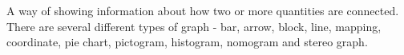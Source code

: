                                         A way of showing information about how two or more quantities 
are connected.
There are several different types of graph - bar, arrow, block, line, mapping, 
coordinate, pie chart, pictogram, histogram, nomogram and stereo graph.
	
	
	
	
	